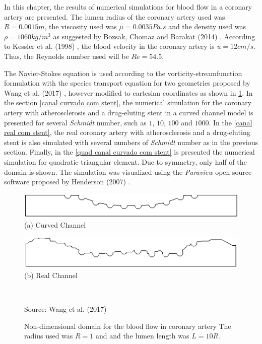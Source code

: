 In this chapter, the results of numerical simulations for 
blood flow in a coronary artery are presented. 
The lumen radius of the coronary artery used was $R=0.0015m$, 
the viscosity used was $\mu=0.0035Pa.s$ and the density used was
$\rho=1060kg/m^3$ as suggested by Bozsak, Chomaz and Barakat (2014)
 \cite{bozsak2014}. According to Kessler et al. (1998) 
\cite{kessler1998}, the blood velocity in the coronary artery 
is $u=12cm/s$. Thus, the Reynolds number used will be 
$Re=54.5$. 

\medskip
The Navier-Stokes equation is used according to the 
vorticity-streamfunction formulation with 
the species transport equation for two geometries proposed 
by Wang et al. (2017) \cite{wang2017}, however modified to 
cartesian coordinates as shown in \ref{coronary artery geo}. 
In the section \ref{canal curvado com stent}, the numerical 
simulation for the coronary artery with atherosclerosis 
and a drug-eluting stent in a curved channel model 
is presented for several 
\textit{Schmidt} number, such as $1$, $10$, $100$ and $1000$. 
In the \ref{canal real com stent}, the real coronary 
artery with atherosclerosis and a drug-eluting stent is also 
simulated with several numbers of \textit{Schmidt} number 
as in the previous section.
Finally, in the \ref{quad canal curvado com stent} is presented
the numerical simulation for quadratic triangular element.
Due to symmetry, only half of the domain is shown. 
The simulation was visualized using the \textit{Paraview} open-source 
software proposed by Henderson (2007) \cite{paraview}.


\begin{figure}[H]
     \caption{Non-dimensional domain for the blood flow in coronary artery
     The radius used was $R=1$ and and the lumen length was $L=10R$.}
     \begin{center}
     \begin{minipage}{.45\linewidth}
     \begin{center}
      \includegraphics[scale=0.22]{./02_chaps/cap_solution/figure/CurvedStrut.png}\\
     (a) Curved Channel
     \end{center}
     \end{minipage}%
     \begin{minipage}{.45\linewidth}
     \begin{center}
      \includegraphics[scale=0.22]{./02_chaps/cap_solution/figure/RealStrut.png}\\
     (b) Real Channel
     \end{center}
     \end{minipage}\\[3mm]
     \end{center}
     \source Source: Wang et al. (2017) \cite{wang2017}
     \label{coronary artery geo}
\end{figure}
